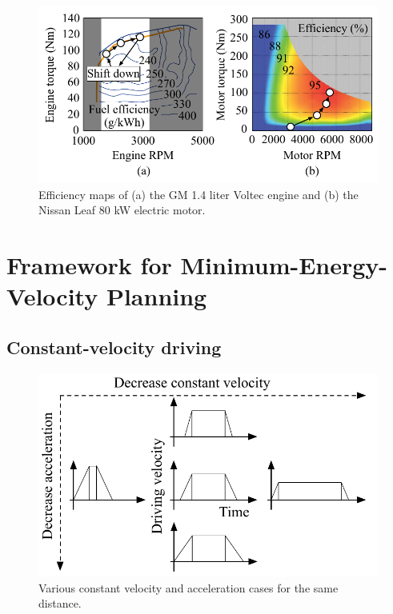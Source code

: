 \documentclass{IEEEtran}
\begin{document}
\begin{figure}	%
\includegraphics[width=1.0\hsize]{Figures/efficiency_maps.pdf}
\caption{Efficiency maps of (a) the GM 1.4 liter Voltec engine and (b) the Nissan Leaf 80 kW electric motor.}
\label{fig:efficiency_map}
\end{figure} 

\section{Framework for Minimum-Energy-Velocity Planning} \label{sec:framework}

\subsection{Constant-velocity driving} \label{subsec:constant drive}

\begin{figure} %
\centering
\includegraphics[width=0.9\hsize]{Figures/const_vel_drive_problem.pdf}
\caption{Various constant velocity and acceleration cases for the same distance.}
\label{fig:const_vel_drive_problem}
\end{figure} 
\end{document}

